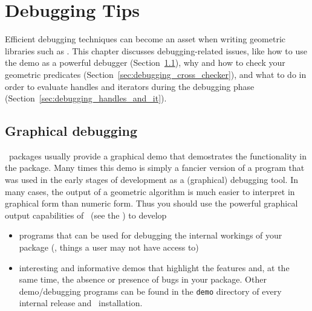 
\chapter{Debugging Tips}
\label{chap:debugging}


Efficient debugging techniques can become an asset when writing geometric 
libraries such as \cgal. 
This chapter discusses debugging-related issues, like how to use 
the demo as a powerful debugger (Section~\ref{sec:graphical_debugging}), 
why and how to check your geometric predicates 
(Section~\ref{sec:debugging_cross_checker}), and what 
to do in order to evaluate handles and iterators during the debugging phase
(Section~\ref{sec:debugging_handles_and_it}).

\section{Graphical debugging} 
\label{sec:graphical_debugging}

\cgal\ packages usually provide a graphical demo that demostrates the 
functionality in the package.  Many times this demo is simply a fancier
version of a program that was used in the early stages of development as a
(graphical) debugging tool.  In many cases, the output of a geometric
algorithm is much easier to interpret in graphical form than numeric
form.  Thus you should use the powerful graphical output capabilities
of \cgal\ (see the ) 
to develop 
\begin{itemize}
   \item programs that can be used for debugging the internal workings
         of your package (\ie, things a user may not have access to)
   \item interesting and informative demos that highlight the features and, 
         at the same time, the absence or presence of bugs in your package.  
         Other demo/debugging programs can be found in the \texttt{demo} 
         directory 
         of every internal release and \cgal\ installation.
\end{itemize}


